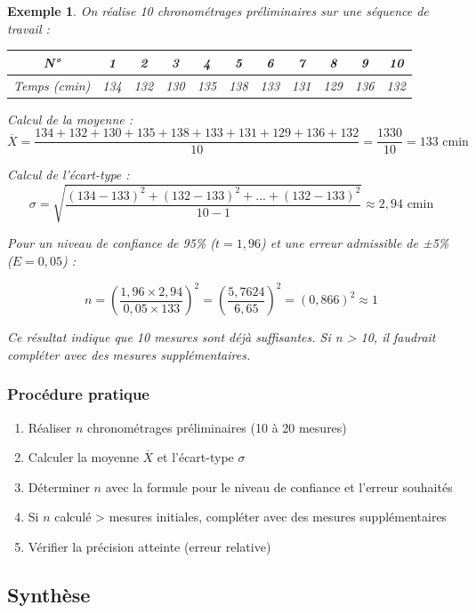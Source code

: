 \documentclass[a4paper,12pt]{article}
\newtheorem{exemple}{Exemple}[section]
\begin{document}
\begin{exemple}
On réalise 10 chronométrages préliminaires sur une séquence de travail :

\begin{center}
\begin{tabular}{|c|c|c|c|c|c|c|c|c|c|c|}
\hline
N° & 1 & 2 & 3 & 4 & 5 & 6 & 7 & 8 & 9 & 10 \\
\hline
Temps (cmin) & 134 & 132 & 130 & 135 & 138 & 133 & 131 & 129 & 136 & 132 \\
\hline
\end{tabular}
\end{center}

Calcul de la moyenne :
\[
\overline{X} = \frac{134 + 132 + 130 + 135 + 138 + 133 + 131 + 129 + 136 + 132}{10} = \frac{1330}{10} = 133 \text{ cmin}
\]

Calcul de l'écart-type :
\[
\sigma = \sqrt{\frac{(134-133)^2 + (132-133)^2 + ... + (132-133)^2}{10-1}} \approx 2,94 \text{ cmin}
\]

Pour un niveau de confiance de 95\% ($t = 1,96$) et une erreur admissible de ±5\% ($E = 0,05$) :

\[
n = \left( \frac{1,96 \times 2,94}{0,05 \times 133} \right)^2 = \left( \frac{5,7624}{6,65} \right)^2 = (0,866)^2 \approx 1
\]

Ce résultat indique que 10 mesures sont déjà suffisantes. Si n > 10, il faudrait compléter avec des mesures supplémentaires.
\end{exemple}

\subsubsection{Procédure pratique}

\begin{enumerate}
    \item Réaliser $n$ chronométrages préliminaires (10 à 20 mesures)
    \item Calculer la moyenne $\overline{X}$ et l'écart-type $\sigma$
    \item Déterminer $n$ avec la formule pour le niveau de confiance et l'erreur souhaités
    \item Si $n$ calculé > mesures initiales, compléter avec des mesures supplémentaires
    \item Vérifier la précision atteinte (erreur relative)
\end{enumerate}

\subsection{Synthèse}
\end{document}
